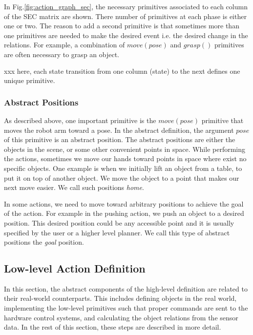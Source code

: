 In Fig.\ref{fig:action_graph_sec}, the necessary primitives associated to each column of the SEC matrix are shown.
There number of primitives at each phase is either one or two.
The reason to add a second primitive is that sometimes more than one primitives are needed to make the desired event i.e. the desired change in the relations.
For example, a combination of $move(pose)$ and $grasp()$ primitives are often necessary to grasp an object.

xxx here, each state transition from one column (state) to the next defines one unique primitive.


\subsubsection{Abstract Positions}

As described above, one important primitive is the $move(pose)$ primitive that moves the robot arm toward a pose.
In the abstract definition, the argument $pose$ of this primitive is an abstract position.
The abstract positions are either the objects in the scene, or some other convenient points in space.
While performing the actions, sometimes we move our hands toward points in space where exist no specific objects.
One example is when we initially lift an object from a table, to put it on top of another object.
We move the object to a point that makes our next move easier.
We call such positions \textit{home}.

In some actions, we need to move toward arbitrary positions to achieve the goal of the action.
For example in the pushing action, we push an object to a desired position.
This desired position could be any accessible point and it is usually specified by the user or a higher level planner.
We call this type of abstract positions the \textit{goal} position.



\subsection{Low-level Action Definition}
\label{sec:low-level}
In this section, the abstract components of the high-level definition are related to their real-world counterparts.
This includes defining objects in the real world, implementing the low-level primitives such that proper commands are sent to the hardware control systems,
and calculating the object relations from the sensor data.
In the rest of this section, these steps are described in more detail.


